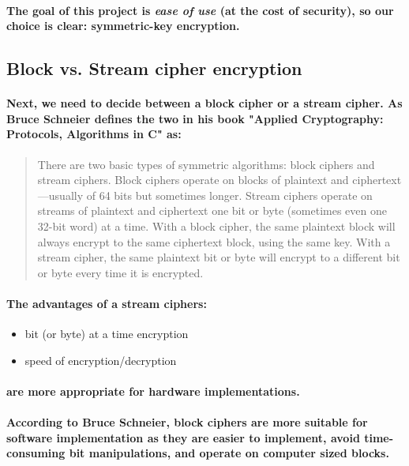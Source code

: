 \paragraph{The goal of this project is \emph{ease of use} (at the cost of security), so our choice is clear: symmetric-key encryption.}

\subsection{Block vs. Stream cipher encryption}
\paragraph{Next, we need to decide between a block cipher or a stream cipher. As Bruce Schneier defines the two in his book "Applied Cryptography: Protocols, Algorithms in C" as:}

\begin{quote}
There are two basic types of symmetric algorithms: block ciphers and stream ciphers. Block ciphers
operate on blocks of plaintext and ciphertext—usually of 64 bits but sometimes longer. Stream
ciphers operate on streams of plaintext and ciphertext one bit or byte (sometimes even one 32-bit
word) at a time. With a block cipher, the same plaintext block will always encrypt to the same
ciphertext block, using the same key. With a stream cipher, the same plaintext bit or byte will
encrypt to a different bit or byte every time it is encrypted.\cite[p. 12]{book2}
\end{quote}
\paragraph{The advantages of a stream ciphers:}

\begin{itemize}
\item bit (or byte) at a time encryption
\item speed of encryption/decryption
\end{itemize}

\paragraph{are more appropriate for hardware implementations.}

\paragraph{According to Bruce Schneier, block ciphers are more suitable for software implementation as they are easier to implement, avoid time-consuming bit manipulations, and operate on computer sized blocks.}\cite[p. 172]{book2}

